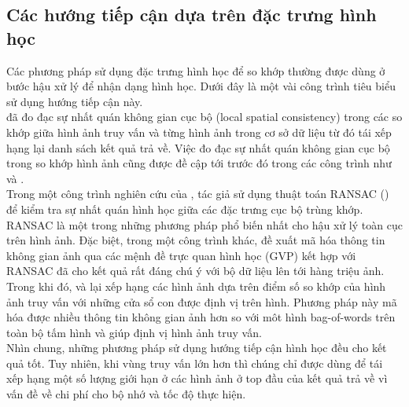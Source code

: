 \subsection{Các hướng tiếp cận dựa trên đặc trưng hình học}
\label{geometry}
Các phương pháp sử dụng đặc trưng hình học để so khớp thường được dùng ở bước hậu xử lý để nhận dạng hình học. Dưới đây là một vài công trình tiêu biểu sử dụng hướng tiếp cận này.\\
\cite{sivic2003video} đã đo đạc sự nhất quán không gian cục bộ (local spatial consistency) trong các so khớp giữa hình ảnh truy vấn và từng hình ảnh trong cơ sở dữ liệu từ đó tái xếp hạng lại danh sách kết quả trả về. Việc đo đạc sự nhất quán không gian cục bộ trong so khớp hình ảnh cũng được đề cập tới trước đó trong các công trình như \cite{zhang1995robust} và \cite{schmid1997local}.\\
Trong một công trình nghiên cứu của \cite{philbin2007object}, tác giả sử dụng thuật toán RANSAC (\cite{fischler1981random}) để kiểm tra sự nhất quán hình học giữa các đặc trưng cục bộ trùng khớp. RANSAC là một trong những phương pháp phổ biến nhất cho hậu xử lý toàn cục trên hình ảnh. Đặc biệt, trong một công trình khác, \cite{zhang2011image} đề xuất mã hóa thông tin không gian ảnh qua các mệnh đề trực quan hình học (GVP) kết hợp với RANSAC đã cho kết quả rất đáng chú ý với bộ dữ liệu lên tới hàng triệu ảnh.\\
Trong khi đó, \cite{lin2010local} và \cite{lampert2009detecting} lại xếp hạng các hình ảnh dựa trên điểm số so khớp của hình ảnh truy vấn với những cửa sổ con được định vị trên hình. Phương pháp này mã hóa được nhiều thông tin không gian ảnh hơn so với môt hình bag-of-words trên toàn bộ tấm hình và giúp định vị hình ảnh truy vấn.\\
Nhìn chung, những phương pháp sử dụng hướng tiếp cận hình học đều cho kết quả tốt. Tuy nhiên, khi vùng truy vấn lớn hơn thì chúng chỉ được dùng để tái xếp hạng một số lượng giới hạn ở các hình ảnh ở top đầu của kết quả trả về vì vấn đề về chi phí cho bộ nhớ và tốc độ thực hiện.

